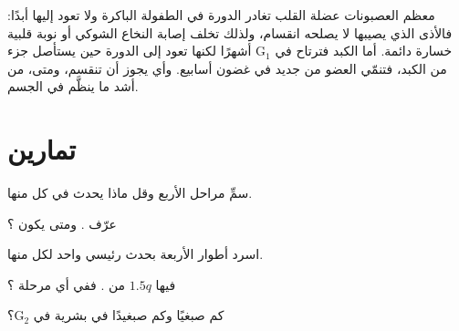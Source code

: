 \begin{remark}\label{rem:g11:cell-cycle-mitosis:notall}
معظم العصبونات  عضلة القلب تغادر الدورة في الطفولة الباكرة ولا
تعود إليها أبدًا: فالأذى الذي يصيبها لا يصلحه انقسام، ولذلك تخلف إصابة
النخاع الشوكي أو نوبة قلبية خسارة دائمة. أما  الكبد فترتاح في
$\mathrm{G_1}$ أشهرًا لكنها تعود إلى الدورة حين يستأصل جزء من الكبد،
فتنمّي العضو من جديد في غضون أسابيع. وأي  يجوز أن تنقسم، ومتى،
من أشد ما ينظَّم في الجسم.
\end{remark}

\section{تمارين}

\begin{exercise}[$\star$]\label{exo:g11:cell-cycle-mitosis:1}
سمِّ مراحل  الأربع وقل ماذا يحدث في كل منها.
\end{exercise}

\begin{exercise}[$\star$]\label{exo:g11:cell-cycle-mitosis:2}
عرّف  . ومتى يكون  ؟
\end{exercise}

\begin{exercise}[$\star$]\label{exo:g11:cell-cycle-mitosis:3}
اسرد أطوار  الأربعة بحدث رئيسي واحد لكل منها.
\end{exercise}

\begin{exercise}[$\star$]\label{exo:g11:cell-cycle-mitosis:4}
 فيها $1.5q$ من . ففي أي مرحلة ؟
\end{exercise}

\begin{exercise}[$\star$]\label{exo:g11:cell-cycle-mitosis:5}
كم صبغيًا وكم صبغيدًا في  بشرية في $\mathrm{G_2}$؟
\end{exercise}


